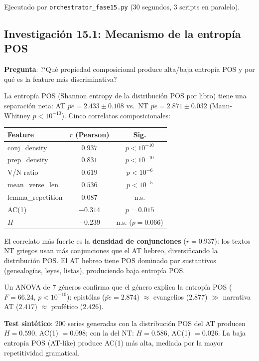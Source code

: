 \documentclass[12pt,a4paper]{article}
\begin{document}
Ejecutado por \texttt{orchestrator\_fase15.py} (30 segundos, 3 scripts en paralelo).

\subsection{Investigaci\'on 15.1: Mecanismo de la entrop\'ia POS}

\textbf{Pregunta}: ?`Qu\'e propiedad composicional produce alta/baja entrop\'ia POS
y por qu\'e es la feature m\'as discriminativa?

La entrop\'ia POS (Shannon entropy de la distribuci\'on POS por libro) tiene una
separaci\'on neta: AT $\bar{pe} = 2.433 \pm 0.108$ vs.\ NT $\bar{pe} = 2.871 \pm 0.032$
(Mann-Whitney $p < 10^{-10}$). Cinco correlatos composicionales:

\begin{center}
\begin{tabular}{lcc}
\toprule
\textbf{Feature} & $r$ (Pearson) & \textbf{Sig.} \\
\midrule
conj\_density & $0.937$ & $p < 10^{-10}$ \\
prep\_density & $0.831$ & $p < 10^{-10}$ \\
V/N ratio     & $0.619$ & $p < 10^{-6}$ \\
mean\_verse\_len & $0.536$ & $p < 10^{-5}$ \\
lemma\_repetition & $0.087$ & n.s. \\
AC(1)         & $-0.314$ & $p = 0.015$ \\
$H$           & $-0.239$ & n.s. ($p = 0.066$) \\
\bottomrule
\end{tabular}
\end{center}

\noindent
El correlato m\'as fuerte es la \textbf{densidad de conjunciones} ($r = 0.937$):
los textos NT griegos usan m\'as conjunciones que el AT hebreo, diversificando la
distribuci\'on POS. El AT hebreo tiene POS dominado por sustantivos (genealog\'ias,
leyes, listas), produciendo baja entrop\'ia POS.

Un ANOVA de 7 g\'eneros confirma que el g\'enero explica la entrop\'ia POS
($F = 66.24$, $p < 10^{-10}$): epist\'olas ($\bar{pe} = 2.874$) $\approx$
evangelios ($2.877$) $\gg$ narrativa AT ($2.417$) $\approx$ prof\'etico ($2.426$).

\textbf{Test sint\'etico}: 200 series generadas con la distribuci\'on POS del AT
producen $H = 0.590$, AC(1) $= 0.098$; con la del NT: $H = 0.586$,
AC(1) $= 0.026$. La baja entrop\'ia POS (AT-like) produce AC(1) m\'as alta,
mediada por la mayor repetitividad gramatical.
\end{document}

